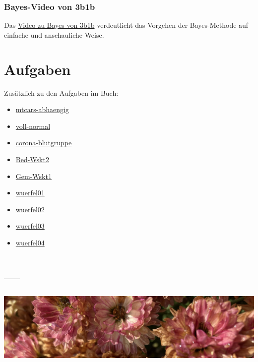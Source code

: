 \documentclass[
  a4paper,
  DIV=11]{scrreprt}
\providecommand{\tightlist}{%
  \setlength{\itemsep}{0pt}\setlength{\parskip}{0pt}}\usepackage{longtable,booktabs,array}
\theoremstyle{definition}
\theoremstyle{remark}
\begin{document}
\hypertarget{bayes-video-von-3b1b}{%
\subsubsection{Bayes-Video von 3b1b}\label{bayes-video-von-3b1b}}

Das \href{https://youtu.be/HZGCoVF3YvM}{Video zu Bayes von 3b1b}
verdeutlicht das Vorgehen der Bayes-Methode auf einfache und
anschauliche Weise.

\hypertarget{aufgaben-1}{%
\section{Aufgaben}\label{aufgaben-1}}

Zusätzlich zu den Aufgaben im Buch:

\begin{itemize}
\tightlist
\item
  \href{https://datenwerk.netlify.app/posts/mtcars-abhaengig/mtcars-abhaengig.html}{mtcars-abhaengig}
\item
  \href{https://datenwerk.netlify.app/posts/voll-normal/voll-normal.html}{voll-normal}
\item
  \href{https://datenwerk.netlify.app/posts/corona-blutgruppe/corona-blutgruppe.html}{corona-blutgruppe}
\item
  \href{https://datenwerk.netlify.app/posts/bed-wskt2/bed-wskt2}{Bed-Wskt2}
\item
  \href{https://datenwerk.netlify.app/posts/gem-wskt1/gem-wskt1}{Gem-Wskt1}
\item
  \href{https://datenwerk.netlify.app/posts/wuerfel01/wuerfel01.html}{wuerfel01}
\item
  \href{https://datenwerk.netlify.app/posts/wuerfel02/wuerfel02.html}{wuerfel02}
\item
  \href{https://datenwerk.netlify.app/posts/wuerfel03/wuerfel03.html}{wuerfel03}
\item
  \href{https://datenwerk.netlify.app/posts/wuerfel04/wuerfel04.html}{wuerfel04}
\end{itemize}

\hypertarget{section-2}{%
\section{---}\label{section-2}}

\includegraphics[width=1\textwidth,height=\textheight]{./img/outro-03.jpg}
\end{document}
